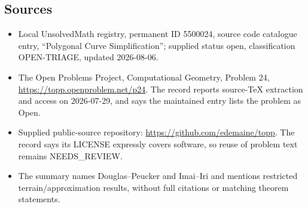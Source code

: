 \documentclass[11pt]{article}
\begin{document}
\subsection{Sources}
\begin{itemize}
\item Local UnsolvedMath registry, permanent ID 5500024, source code catalogue entry, ``Polygonal Curve Simplification''; supplied status open, classification OPEN-TRIAGE, updated 2026-08-06.
\item The Open Problems Project, Computational Geometry, Problem 24, \url{https://topp.openproblem.net/p24}. The record reports source-TeX extraction and access on 2026-07-29, and says the maintained entry lists the problem as Open.
\item Supplied public-source repository: \url{https://github.com/edemaine/topp}. The record says its LICENSE expressly covers software, so reuse of problem text remains NEEDS\_REVIEW.
\item The summary names Douglas--Peucker and Imai--Iri and mentions restricted terrain/approximation results, without full citations or matching theorem statements.
\end{itemize}
\end{document}

